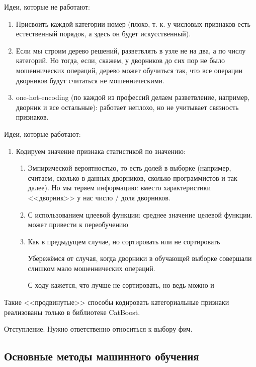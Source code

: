 \documentclass[main.tex]{subfiles}
\begin{document}
Идеи, которые не работают:
\begin{enumerate}[noitemsep]
	\item Присвоить каждой категории номер (плохо, т. к. у числовых признаков есть естественный порядок, а здесь он будет искусственный).
	\item Если мы строим дерево решений, разветвлять в узле не на два, а по числу категорий. Но тогда, если, скажем, у дворников до сих пор не было мошеннических операций, дерево может обучиться так, что все операции дворников будут считаться не мошенническими.
	\item one-hot-encoding (по каждой из профессий делаем разветвление, например, дворник и все остальные): работает неплохо, но не учитывает связность признаков. 
\end{enumerate}
 
Идеи, которые работают:

\begin{enumerate}[noitemsep]
	\item Кодируем значение признака статистикой по значению:
	\begin{enumerate}[noitemsep]
		\item Эмпирической вероятностью, то есть долей в выборке (например, считаем, сколько в данных дворников, сколько программистов и так далее).
		Но мы теряем информацию: вместо характеристики <<дворник>> у нас число / доля дворников.
		\item С использованием цлеевой функции: среднее значение целевой функции. может привести к переобучению %
		\item Как в предыдущем случае, но сортировать или не сортировать %
		
		Убережёмся от случая, когда дворники в обучающей выборке совершали слишком мало мошеннических операций.
		
		С ходу кажется, что лучше не сортировать, но ведь можно и 
	\end{enumerate}
\end{enumerate}

Такие <<продвинутые>> способы кодировать категориальные признаки реализованы только в библиотеке CatBoost.

\begin{leftbar}
	Отступление.
	Нужно ответственно относиться к выбору фич. %
\end{leftbar}

\subsection{Основные методы машинного обучения}
\end{document}
